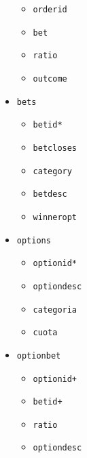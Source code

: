 \documentclass{article}
\begin{document}
\begin{multicols}{2}
\begin{itemize}
\begin{itemize}
            \item\texttt{orderid}
            \item\texttt{bet}
            \item\texttt{ratio}
            \item\texttt{outcome}
        \end{itemize}
    \item\texttt{bets}
        \begin{itemize}
            \item\texttt{betid*}
            \item\texttt{betcloses}
            \item\texttt{category}
            \item\texttt{betdesc}
            \item\texttt{winneropt}
        \end{itemize}
    \item\texttt{options}
        \begin{itemize}
            \item\texttt{optionid*}
            \item\texttt{optiondesc}
            \item\texttt{categoria}
            \item\texttt{cuota}
        \end{itemize}
    \item\texttt{optionbet}
        \begin{itemize}
            \item\texttt{optionid+}
            \item\texttt{betid+}
            \item\texttt{ratio}
            \item\texttt{optiondesc}
        \end{itemize}
\end{itemize}
\end{multicols}
\newpage
\end{document}
